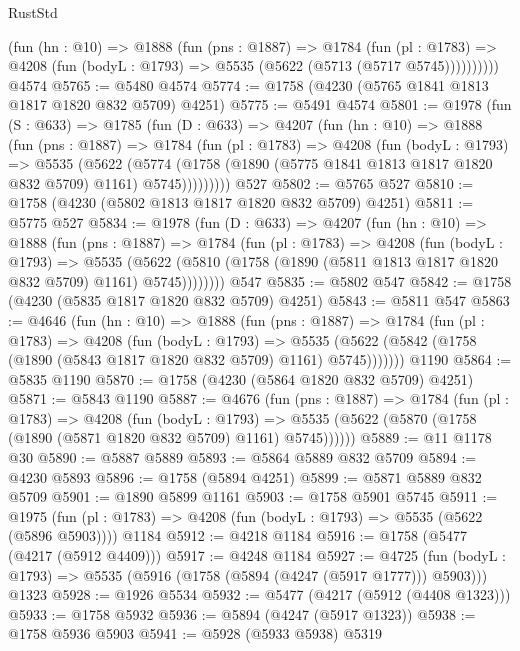 \begin{lexlean}{RustStd}
\begin{coremodule}
          (fun (hn : @10) =>
          @1888
            (fun (pns : @1887) =>
            @1784
              (fun (pl : @1783) =>
              @4208 (fun (bodyL : @1793) => @5535 (@5622 (@5713 (@5717 @5745))))))))))
    @4574
@5765 := @5480 @4574
@5774 := @1758 (@4230 (@5765 @1841 @1813 @1817 @1820 @832 @5709) @4251)
@5775 := @5491 @4574
@5801 := @1978
    (fun (S : @633) =>
    @1785
      (fun (D : @633) =>
      @4207
        (fun (hn : @10) =>
        @1888
          (fun (pns : @1887) =>
          @1784
            (fun (pl : @1783) =>
            @4208
              (fun (bodyL : @1793) =>
              @5535
                (@5622
                  (@5774
                    (@1758 (@1890 (@5775 @1841 @1813 @1817 @1820 @832 @5709) @1161) @5745)))))))))
    @527
@5802 := @5765 @527
@5810 := @1758 (@4230 (@5802 @1813 @1817 @1820 @832 @5709) @4251)
@5811 := @5775 @527
@5834 := @1978
    (fun (D : @633) =>
    @4207
      (fun (hn : @10) =>
      @1888
        (fun (pns : @1887) =>
        @1784
          (fun (pl : @1783) =>
          @4208
            (fun (bodyL : @1793) =>
            @5535
              (@5622 (@5810 (@1758 (@1890 (@5811 @1813 @1817 @1820 @832 @5709) @1161) @5745))))))))
    @547
@5835 := @5802 @547
@5842 := @1758 (@4230 (@5835 @1817 @1820 @832 @5709) @4251)
@5843 := @5811 @547
@5863 := @4646
    (fun (hn : @10) =>
    @1888
      (fun (pns : @1887) =>
      @1784
        (fun (pl : @1783) =>
        @4208
          (fun (bodyL : @1793) =>
          @5535 (@5622 (@5842 (@1758 (@1890 (@5843 @1817 @1820 @832 @5709) @1161) @5745)))))))
    @1190
@5864 := @5835 @1190
@5870 := @1758 (@4230 (@5864 @1820 @832 @5709) @4251)
@5871 := @5843 @1190
@5887 := @4676
    (fun (pns : @1887) =>
    @1784
      (fun (pl : @1783) =>
      @4208
        (fun (bodyL : @1793) =>
        @5535 (@5622 (@5870 (@1758 (@1890 (@5871 @1820 @832 @5709) @1161) @5745))))))
@5889 := @11 @1178 @30
@5890 := @5887 @5889
@5893 := @5864 @5889 @832 @5709
@5894 := @4230 @5893
@5896 := @1758 (@5894 @4251)
@5899 := @5871 @5889 @832 @5709
@5901 := @1890 @5899 @1161
@5903 := @1758 @5901 @5745
@5911 := @1975
    (fun (pl : @1783) => @4208 (fun (bodyL : @1793) => @5535 (@5622 (@5896 @5903))))
    @1184
@5912 := @4218 @1184
@5916 := @1758 (@5477 (@4217 (@5912 @4409)))
@5917 := @4248 @1184
@5927 := @4725
    (fun (bodyL : @1793) => @5535 (@5916 (@1758 (@5894 (@4247 (@5917 @1777))) @5903)))
    @1323
@5928 := @1926 @5534
@5932 := @5477 (@4217 (@5912 (@4408 @1323)))
@5933 := @1758 @5932
@5936 := @5894 (@4247 (@5917 @1323))
@5938 := @1758 @5936 @5903
@5941 := @5928 (@5933 @5938) @5319

\end{coremodule}
\end{lexlean}
